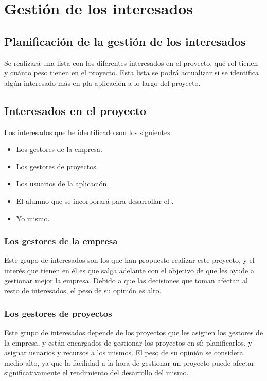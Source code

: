 \section{Gestión de los interesados}
\subsection{Planificación de la gestión de los interesados}
Se realizará una lista con los diferentes interesados en el proyecto, qué
rol tienen y cuánto peso tienen en el proyecto. Esta lista se podrá actualizar
si se identifica algún interesado más en pla aplicación a lo largo del
proyecto.

\subsection{Interesados en el proyecto}
Los interesados que he identificado son los siguientes:

\begin{itemize}
    \item Los gestores de la empresa.
    \item Los gestores de proyectos.
    \item Los usuarios de la aplicación.
    \item El alumno que se incorporará para desarrollar el .
    \item Yo mismo.
\end{itemize}

\subsubsection{Los gestores de la empresa}
Este grupo de interesados son los que han propuesto realizar este proyecto, y el
interés que tienen en él es que salga adelante con el objetivo de que les ayude a gestionar
mejor la empresa. Debido a que las decisiones que toman afectan al resto de interesados,
el peso de su opinión es alto.

\subsubsection{Los gestores de proyectos}
Este grupo de interesados depende de los proyectos que les asignen los gestores
de la empresa, y están encargados de gestionar los proyectos en sí: planificarlos,
y asignar usuarios y recursos a los mismos. El peso de su opinión se considera
medio-alto, ya que la facilidad a la hora de gestionar un proyecto
puede afectar significativamente el rendimiento del desarrollo del mismo.

